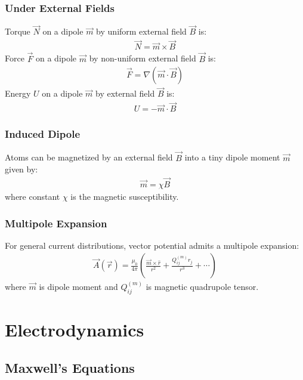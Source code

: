 \documentclass[12pt, a4paper]{article}
\begin{document}
\begin{multicols*}{3}
\subsubsection{Under External Fields}
Torque $\vec{N}$ on a dipole $\vec{m}$ by uniform external field $\vec{B}$ is:
\begin{align*}
  \vec{N} = \vec{m} \times \vec{B}
\end{align*}
Force $\vec{F}$ on a dipole $\vec{m}$ by non-uniform external field $\vec{B}$ is:
\begin{align*}
  \vec{F} = \nabla(\vec{m}\cdot \vec{B})
\end{align*}
Energy $U$ on a dipole $\vec{m}$ by external field $\vec{B}$ is:
\begin{align*}
  U = -\vec{m}\cdot \vec{B}
\end{align*}

\subsubsection{Induced Dipole}
Atoms can be magnetized by an external field $\vec{B}$ into a tiny dipole moment $\vec{m}$ given by:
\begin{align*}
  \vec{m} = \chi \vec{B}
\end{align*}
where constant $\chi$ is the magnetic susceptibility.

\subsubsection{Multipole Expansion}
For general current distributions, vector potential admits a multipole expansion:
\begin{align*}
  \vec{A}(\vec{r}) = \frac{\mu_0}{4\pi}\left(\frac{\vec{m}\times \hat r}{r^2} 
  + \frac{Q_{ij}^{(m)} r_j}{r^3} + \cdots\right)
\end{align*}
where $\vec{m}$ is dipole moment and $Q_{ij}^{(m)}$ is magnetic quadrupole tensor.

\colbreak
\section{Electrodynamics}
\subsection{Maxwell's Equations}
\end{multicols*}
\end{document}
